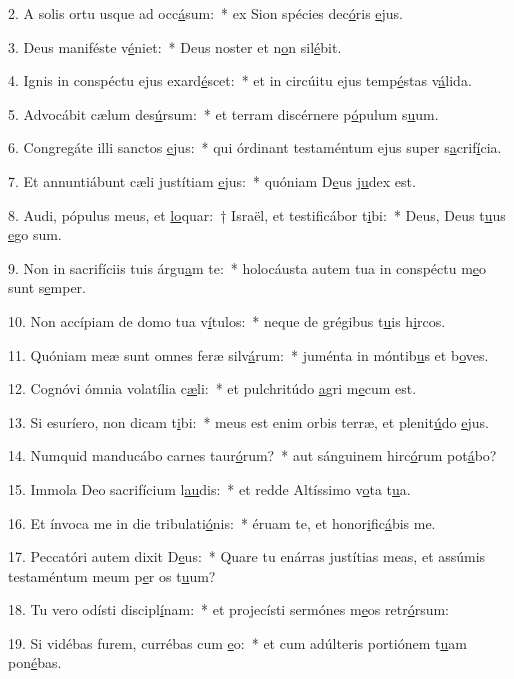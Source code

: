 2. A solis ortu usque ad occ\uline{á}sum:~* ex Sion spécies dec\uline{ó}ris \uline{e}jus.\par 
3. Deus maniféste v\uline{é}niet:~* Deus noster et n\uline{o}n sil\uline{é}bit.\par 
4. Ignis in conspéctu ejus exard\uline{é}scet:~* et in circúitu ejus temp\uline{é}stas v\uline{á}lida.\par 
5. Advocábit cælum des\uline{ú}rsum:~* et terram discérnere p\uline{ó}pulum s\uline{u}um.\par 
6. Congregáte illi sanctos \uline{e}jus:~* qui órdinant testaméntum ejus super s\uline{a}crif\uline{í}cia.\par 
7. Et annuntiábunt cæli justítiam \uline{e}jus:~* quóniam D\uline{e}us j\uline{u}dex est.\par 
8. Audi, pópulus meus, et \uline{lo}quar:~† Israël, et testificábor t\uline{i}bi:~* Deus, Deus t\uline{u}us \uline{e}go sum.\par 
9. Non in sacrifíciis tuis árgu\uline{a}m te:~* holocáusta autem tua in conspéctu m\uline{e}o sunt s\uline{e}mper.\par 
10. Non accípiam de domo tua v\uline{í}tulos:~* neque de grégibus t\uline{u}is h\uline{i}rcos.\par 
11. Quóniam meæ sunt omnes feræ silv\uline{á}rum:~* juménta in móntib\uline{u}s et b\uline{o}ves.\par 
12. Cognóvi ómnia volatília c\uline{æ}li:~* et pulchritúdo \uline{a}gri m\uline{e}cum est.\par 
13. Si esuríero, non dicam t\uline{i}bi:~* meus est enim orbis terræ, et plenit\uline{ú}do \uline{e}jus.\par 
14. Numquid manducábo carnes taur\uline{ó}rum?~* aut sánguinem hirc\uline{ó}rum pot\uline{á}bo?\par 
15. Immola Deo sacrifícium l\uline{au}dis:~* et redde Altíssimo v\uline{o}ta t\uline{u}a.\par 
16. Et ínvoca me in die tribulati\uline{ó}nis:~* éruam te, et honor\uline{i}fic\uline{á}bis me.\par 
17. Peccatóri autem dixit D\uline{e}us:~* Quare tu enárras justítias meas, et assúmis testaméntum meum p\uline{e}r os t\uline{u}um?\par 
18. Tu vero odísti discipl\uline{í}nam:~* et projecísti sermónes m\uline{e}os retr\uline{ó}rsum:\par 
19. Si vidébas furem, currébas cum \uline{e}o:~* et cum adúlteris portiónem t\uline{u}am pon\uline{é}bas.\par 
